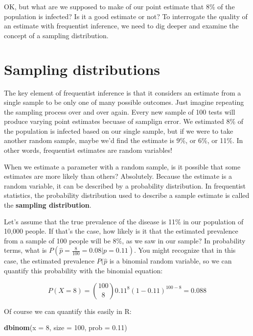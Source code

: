 \documentclass[
]{book}
\newenvironment{Shaded}{\begin{snugshade}}{\end{snugshade}}
\newcommand{\AttributeTok}[1]{\textcolor[rgb]{0.13,0.29,0.53}{#1}}
\newcommand{\DecValTok}[1]{\textcolor[rgb]{0.00,0.00,0.81}{#1}}
\newcommand{\FloatTok}[1]{\textcolor[rgb]{0.00,0.00,0.81}{#1}}
\newcommand{\FunctionTok}[1]{\textcolor[rgb]{0.13,0.29,0.53}{\textbf{#1}}}
\newcommand{\NormalTok}[1]{#1}
\begin{document}
OK, but what are we supposed to make of our point estimate that 8\% of the population is infected? Is it a good estimate or not? To interrogate the quality of an estimate with frequentist inference, we need to dig deeper and examine the concept of a sampling distribution.

\section{Sampling distributions}\label{sampling-distributions}

The key element of frequentist inference is that it considers an estimate from a single sample to be only one of many possible outcomes. Just imagine repeating the sampling process over and over again. Every new sample of 100 tests will produce varying point estimates becuase of samplign error. We estimated 8\% of the population is infected based on our single sample, but if we were to take another random sample, maybe we'd find the estimate is 9\%, or 6\%, or 11\%. In other words, frequentist estimates are random variables!

When we estimate a parameter with a random sample, is it possible that some estimates are more likely than others? Absolutely. Because the estimate is a random variable, it can be described by a probability distribution. In frequentist statistics, the probability distribution used to describe a sample estimate is called the \textbf{sampling distribution}.

Let's assume that the true prevalence of the disease is 11\% in our population of 10,000 people. If that's the case, how likely is it that the estimated prevalence from a sample of 100 people will be 8\%, as we saw in our sample? In probability terms, what is \(P(\hat{p}=\frac{8}{100}=0.08|p=0.11)\). You might recognize that in this case, the estimated prevalence \(P(\hat{p}\) is a binomial random variable, so we can quantify this probability with the binomial equation:

\[
P(X = 8) = \binom{100}{8} 0.11^8 (1 - 0.11)^{100 - 8}=0.088
\]

Of course we can quantify this easily in R:

\begin{Shaded}
\begin{Highlighting}[]
\FunctionTok{dbinom}\NormalTok{(}\AttributeTok{x =} \DecValTok{8}\NormalTok{, }\AttributeTok{size =} \DecValTok{100}\NormalTok{, }\AttributeTok{prob =} \FloatTok{0.11}\NormalTok{)}
\end{Highlighting}
\end{Shaded}
\end{document}
